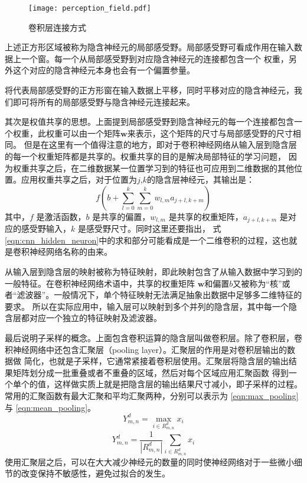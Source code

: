 \begin{figure}[htbp]
	\texttt{[image: perception\_field.pdf]}
	\caption{卷积层连接方式}
	\label{perception_filed}
\end{figure}
上述正方形区域被称为隐含神经元的局部感受野。局部感受野可看成作用在输入数据上一个窗。每一个从局部感受野到对应隐含神经元的连接都包含一个
权重，另外这个对应的隐含神经元本身也会有一个偏置参量。

将代表局部感受野的正方形窗在输入数据上平移，同时平移对应的隐含神经元，我们即可将所有的局部感受野与隐含神经元连接起来。

其次是权值共享的思想。上面提到局部感受野到隐含神经元的每一个连接都包含一个权重，此权重可以由一个矩阵$\mathbf{w}$来表示，这个矩阵的尺寸与局部感受野的尺寸相同。
但是在这里有一个值得注意的地方，即对于卷积神经网络从输入层到隐含层的每一个权重矩阵都是共享的。权重共享的目的是解决局部特征的学习问题，
因为权重共享之后，在二维数据某一位置学习到的特征也可应用到二维数据的其他位置。应用权重共享之后，对于位置为$j$,$k$的隐含层神经元，其输出是：
\begin{equation} 
\label{eqn:cnn_hidden_neuron}
f\left(b+\sum_{l=0}^{k} \sum_{m=0}^{k} w_{l, m} a_{j+l, k+m}\right)
\end{equation}
其中，$f$ 是激活函数，$b$ 是共享的偏置，$w_{l,m}$ 是共享的权重矩阵，$a_{j+l,k+m}$ 是对应的感受野输入，$k$ 是感受野尺寸。同时这里还要指出，
式\ref{eqn:cnn_hidden_neuron}中的求和部分可能看成是一个二维卷积的过程，这也就是卷积神经网络名称的由来。

从输入层到隐含层的映射被称为特征映射，即此映射包含了从输入数据中学习到的一般特征。在卷积神经网络术语中，共享的权重矩阵
$\mathbf{w}$和偏置$b$又被称为“核”或者“滤波器”。一般情况下，单个特征映射无法满足抽象出数据中足够多二维特征的要求。
所以在实际应用中，输入层可以映射到多个并列的隐含层，其中每一个隐含层都对应一个独立的特征映射及滤波器。

最后说明子采样的概念。上面包含卷积运算的隐含层叫做卷积层。除了卷积层，卷积神经网络中还包含汇聚层（pooling layer）。汇聚层的作用是对卷积层输出的数据做
简化，也就是子采样，它通常紧接着卷积层使用。汇聚层将隐含层的输出结果矩阵划分成一批重叠或者不重叠的区域，然后对每个区域应用汇聚函数
得到一个单个的值，这样做实质上就是把隐含层的输出结果尺寸减小，即子采样的过程。常用的汇聚函数有最大汇聚和平均汇聚两种，分别可以表示为
\ref{eqn:max_pooling} 与 \ref{eqn:mean_pooling}。
\begin{equation}
\label{eqn:max_pooling} 
Y_{m, n}^{d}=\max _{i \in R_{m, n}^{d}} x_{i}
\end{equation}
\begin{equation} 
\label{eqn:mean_pooling}
Y_{m, n}^{d}=\frac{1}{\left|R_{m, n}^{d}\right|} \sum_{i \in R_{m, n}^{d}} x_{i}
\end{equation}
使用汇聚层之后，可以在大大减少神经元的数量的同时使神经网络对于一些微小细节的改变保持不敏感性，避免过拟合的发生。

